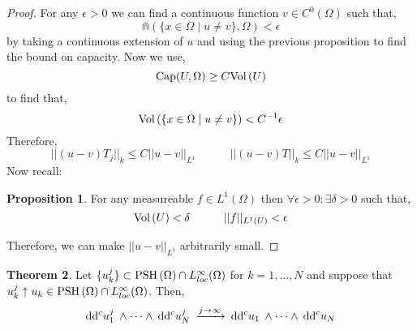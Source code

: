 \documentclass[12pt]{extarticle}
\theoremstyle{definition}
\newtheorem{theorem}{Theorem}[section]
\newtheorem{proposition}[theorem]{Proposition}
\begin{document}
\begin{proof}
For any $\epsilon > 0$ we can find a continuous function $v \in C^0(\Omega)$ such that,
\[ \Cap(\{x \in \Omega \mid u \neq v \}, \Omega) < \epsilon \]
by taking a continuous extension of $u$ and using the previous proposition to find the bound on capacity. Now we use,
\[ \mathrm{Cap}(U, \Omega) \ge C \mathrm{Vol}\left(U\right) \]
to find that,
\[ \mathrm{Vol}\left( \{x \in \Omega \mid u \neq v \} \right) < C^{-1} \epsilon \]
Therefore,
\[ ||(u - v) T_j ||_k \le C || u -v ||_{L^1} \quad \quad \quad || (u - v) T ||_k \le C || u - v||_{L^1} \]
Now recall:

\begin{proposition}
For any measureable $f \in L^1(\Omega)$ then $\forall \epsilon > 0 : \exists \delta > 0$ such that,
\[ \mathrm{Vol}\left(U\right) < \delta \quad \quad \quad || f ||_{L^1(U)} < \epsilon \]
\end{proposition}
Therefore, we can make $|| u - v ||_{L^1}$ arbitrarily small. 
\end{proof}

\begin{theorem}
Let $\{ u^j_k \} \subset \mathrm{PSH}\left( \Omega \right) \cap L^\infty_{loc}(\Omega)$ for $k = 1, \dots, N$ and suppose that $u^j_k \uparrow u_k \in \mathrm{PSH}\left( \Omega \right) \cap L^\infty_{loc}(\Omega)$. Then,
\[ \: \mathrm{d}\mathrm{d}^c{u_1^j} \: \wedge \cdots \wedge \: \mathrm{d}\mathrm{d}^c{u_N^j} \: \xrightarrow{j \to \infty} \: \mathrm{d}\mathrm{d}^c{u_1} \: \wedge \cdots \wedge \: \mathrm{d}\mathrm{d}^c{u_N} \: \]
\end{theorem}
\end{document}
